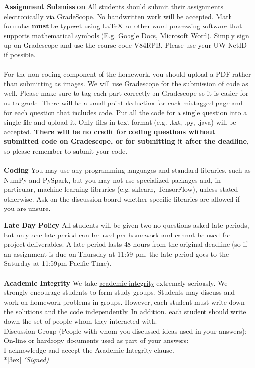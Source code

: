 \textbf{Assignment Submission} All students should submit their assignments electronically via GradeScope. No handwritten work will be accepted. Math formulas \textbf{must} be typeset using \LaTeX\ or other word processing software that supports mathematical symbols (E.g. Google Docs, Microsoft Word). Simply sign up on Gradescope and use the course code V84RPB. Please use your UW NetID if possible.
\\
\\
For the non-coding component of the homework, you should upload a PDF rather than submitting as images. We will use Gradescope for the submission of code as well. Please make sure to tag each part correctly on Gradescope so it is easier for us to grade. There will be a small point deduction for each mistagged page and for each question that includes code. Put all the code for a single question into a single file and upload it. Only files in text format (e.g. .txt, .py, .java) will be accepted. \textbf{There will be no credit for coding questions without submitted code on Gradescope, or for submitting it after the deadline}, so please remember to submit your code.
\\
\\
\textbf{Coding} You may use any programming languages and standard libraries, such as NumPy and PySpark, but you may not use specialized packages and, in particular, machine learning libraries (e.g. sklearn, TensorFlow), unless stated otherwise. Ask on the discussion board whether specific libraries are allowed if you are unsure. 

\textbf{Late Day Policy } All students will be given two no-questions-asked late periods, but only one late period can be used per homework and cannot be used for project deliverables. A late-period lasts 48 hours from the original deadline (so if an assignment is due on Thursday at 11:59 pm, the late period goes to the Saturday at 11:59pm Pacific Time).
\\
\\
\textbf{Academic Integrity} We take \href{https://www.cs.washington.edu/academics/misconduct}{academic integrity} extremely seriously. 
We strongly encourage students to form study groups. Students may discuss and work on homework problems in groups. However, each student must write down the solutions and the code independently. In addition, each student should write down the set of people whom they interacted with. 
\\
\vfill
Discussion Group (People with whom you discussed ideas used in your answers):
\\
\vfill
On-line or hardcopy documents used as part of your answers: 
\\
\vfill
I acknowledge and accept the Academic Integrity clause.\\*[3ex]
\bigskip
\textit{(Signed)}\hrulefill

\vfill